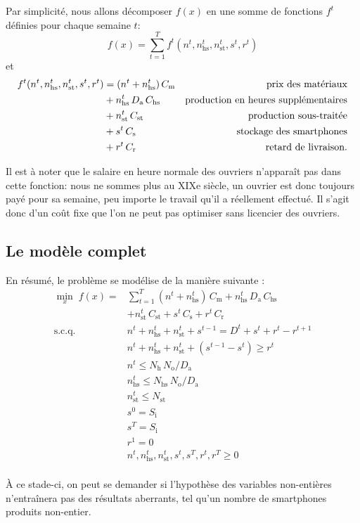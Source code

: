 Par simplicité, nous allons décomposer $f(x)$ en une somme de fonctions $f^t$ définies pour chaque semaine $t$:
\[
    f(x) = \sum_{t=1}^{T} f^t(n^t, n_\mathrm{hs}^t, n_\mathrm{st}^t, s^t, r^t)
\]
et
\begin{align*}
    f^t(n^t, n_\mathrm{hs}^t, n_\mathrm{st}^t, s^t, r^t)
    &= (n^t + n_\mathrm{hs}^t)\,C_\mathrm{m} 
    & \text{prix des matériaux}\\
    &+ n_\mathrm{hs}^t\,D_\mathrm{a}\,C_\mathrm{hs}
    & \text{production en heures supplémentaires}\\
    &+ n_\mathrm{st}^t\,C_\mathrm{st}
    & \text{production sous-traitée}\\
    &+ s^t\,C_\mathrm{s}
    & \text{stockage des smartphones}\\
    &+ r^t\,C_\mathrm{r}
    & \text{retard de livraison}
    \text.
\end{align*}

Il est à noter que le salaire en heure normale des ouvriers n'apparaît pas dans cette fonction: nous ne sommes plus au XIXe siècle, un ouvrier est donc toujours payé pour sa semaine, peu importe le travail qu'il a réellement effectué. Il s'agit donc d'un coût fixe que l'on ne peut pas optimiser sans licencier des ouvriers.

\subsection*{Le modèle complet}

En résumé, le problème se modélise de la manière suivante :
\begin{align*}
    \min_{x}\;f(x) =& \sum_{t=1}^{T}
    (n^t + n_\mathrm{hs}^t)\,C_\mathrm{m} 
    + n_\mathrm{hs}^t\,D_\mathrm{a}\,C_\mathrm{hs} \\
    &+ n_\mathrm{st}^t\,C_\mathrm{st}
    + s^t\,C_\mathrm{s}
    + r^t\,C_\mathrm{r} \\[0.5em]
%
    \mathrm{s.c.q.}\;\phantom{f(x) =}
    & n^t + n_\mathrm{hs}^t + n_\mathrm{st}^t + s^{t-1} = D^t + s^t + r^t - r^{t+1} \\
    & n^t + n_\mathrm{hs}^t + n_\mathrm{st}^t + (s^{t-1} - s^t) \geq r^t \\
    & n^t \leq N_\mathrm{h}\,N_\mathrm{o}/D_\mathrm{a} \\
    & n_\mathrm{hs}^t \leq N_\mathrm{hs}\,N_\mathrm{o}/D_\mathrm{a} \\
    & n_\mathrm{st}^t \leq N_\mathrm{st} \\
    & s^0 = S_\mathrm{i} \\
    & s^T = S_\mathrm{i} \\
    & r^1 = 0 \\
    & n^t, n_\mathrm{hs}^t, n_\mathrm{st}^t, s^t, s^T, r^t, r^T \geq 0 \\
\end{align*}

À ce stade-ci, on peut se demander si l'hypothèse des variables non-entières n'entraînera pas des résultats aberrants, tel qu'un nombre de smartphones produits non-entier.

